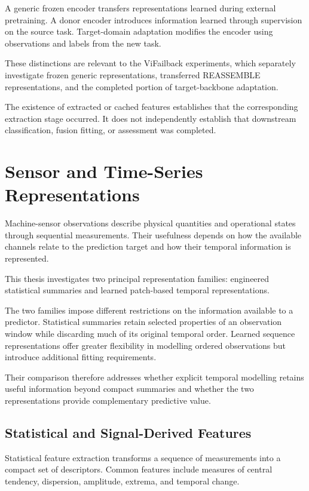 A generic frozen encoder transfers representations learned during external pretraining. A donor encoder introduces information learned through supervision on the source task. Target-domain adaptation modifies the encoder using observations and labels from the new task.

These distinctions are relevant to the ViFailback experiments, which separately investigate frozen generic representations, transferred REASSEMBLE representations, and the completed portion of target-backbone adaptation.

The existence of extracted or cached features establishes that the corresponding extraction stage occurred. It does not independently establish that downstream classification, fusion fitting, or assessment was completed.

\section{Sensor and Time-Series Representations}

Machine-sensor observations describe physical quantities and operational states through sequential measurements. Their usefulness depends on how the available channels relate to the prediction target and how their temporal information is represented.

This thesis investigates two principal representation families: engineered statistical summaries and learned patch-based temporal representations.

The two families impose different restrictions on the information available to a predictor. Statistical summaries retain selected properties of an observation window while discarding much of its original temporal order. Learned sequence representations offer greater flexibility in modelling ordered observations but introduce additional fitting requirements.

Their comparison therefore addresses whether explicit temporal modelling retains useful information beyond compact summaries and whether the two representations provide complementary predictive value.

\subsection{Statistical and Signal-Derived Features}

Statistical feature extraction transforms a sequence of measurements into a compact set of descriptors. Common features include measures of central tendency, dispersion, amplitude, extrema, and temporal change.

